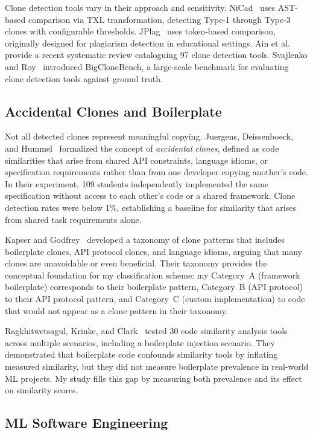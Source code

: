 \documentclass[smallextended,natbib]{svjour3}
\begin{document}
Clone detection tools vary in their approach and sensitivity. NiCad~\citep{cordy2011} uses AST-based comparison via TXL transformation, detecting Type-1 through Type-3 clones with configurable thresholds. JPlag~\citep{jplag2000} uses token-based comparison, originally designed for plagiarism detection in educational settings. Ain et al.~\citep{ain2019} provide a recent systematic review cataloguing 97 clone detection tools. Svajlenko and Roy~\citep{svajlenko2015} introduced BigCloneBench, a large-scale benchmark for evaluating clone detection tools against ground truth.

\subsection{Accidental Clones and Boilerplate}

Not all detected clones represent meaningful copying. Juergens, Deissenboeck, and Hummel~\citep{juergens2010} formalized the concept of \emph{accidental clones}, defined as code similarities that arise from shared API constraints, language idioms, or specification requirements rather than from one developer copying another's code. In their experiment, 109 students independently implemented the same specification without access to each other's code or a shared framework. Clone detection rates were below 1\%, establishing a baseline for similarity that arises from shared task requirements alone.

Kapser and Godfrey~\citep{kapser2008} developed a taxonomy of clone patterns that includes boilerplate clones, API protocol clones, and language idioms, arguing that many clones are unavoidable or even beneficial. Their taxonomy provides the conceptual foundation for my classification scheme: my Category~A (framework boilerplate) corresponds to their boilerplate pattern, Category~B (API protocol) to their API protocol pattern, and Category~C (custom implementation) to code that would not appear as a clone pattern in their taxonomy.

Ragkhitwetsagul, Krinke, and Clark~\citep{ragkhitwetsagul2018} tested 30 code similarity analysis tools across multiple scenarios, including a boilerplate injection scenario. They demonstrated that boilerplate code confounds similarity tools by inflating measured similarity, but they did not measure boilerplate prevalence in real-world ML projects. My study fills this gap by measuring both prevalence and its effect on similarity scores.

\subsection{ML Software Engineering}
\end{document}
